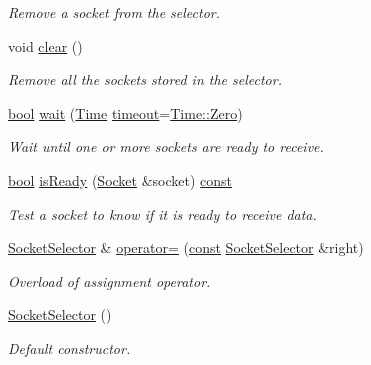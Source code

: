 \begin{DoxyCompactItemize}
\begin{DoxyCompactList}\small\item\em Remove a socket from the selector. \end{DoxyCompactList}\item 
void \hyperlink{classsf_1_1_socket_selector_a76e650acb0199d4be91e90a493fbc91a}{clear} ()
\begin{DoxyCompactList}\small\item\em Remove all the sockets stored in the selector. \end{DoxyCompactList}\item 
\hyperlink{term__entry_8h_a002004ba5d663f149f6c38064926abac}{bool} \hyperlink{classsf_1_1_socket_selector_a9cfda5475f17925e65889394d70af702}{wait} (\hyperlink{classsf_1_1_time}{Time} \hyperlink{_ndk_8cpp_a174cf046f3b5dbb1258515b3f138b8c7}{timeout}=\hyperlink{classsf_1_1_time_aa343e67f43a940e7b3b51aa10a495f2f}{Time\-::\-Zero})
\begin{DoxyCompactList}\small\item\em Wait until one or more sockets are ready to receive. \end{DoxyCompactList}\item 
\hyperlink{term__entry_8h_a002004ba5d663f149f6c38064926abac}{bool} \hyperlink{classsf_1_1_socket_selector_a8e67b463db05eadb4d356992c896833c}{is\-Ready} (\hyperlink{classsf_1_1_socket}{Socket} \&socket) \hyperlink{term__entry_8h_a57bd63ce7f9a353488880e3de6692d5a}{const} 
\begin{DoxyCompactList}\small\item\em Test a socket to know if it is ready to receive data. \end{DoxyCompactList}\item 
\hyperlink{classsf_1_1_socket_selector}{Socket\-Selector} \& \hyperlink{classsf_1_1_socket_selector_ae6395c7a8d29a9ea14939cc5d1ba3a33}{operator=} (\hyperlink{term__entry_8h_a57bd63ce7f9a353488880e3de6692d5a}{const} \hyperlink{classsf_1_1_socket_selector}{Socket\-Selector} \&right)
\begin{DoxyCompactList}\small\item\em Overload of assignment operator. \end{DoxyCompactList}\item 
\hyperlink{classsf_1_1_socket_selector_a741959c5158aeb1e4457cad47d90f76b}{Socket\-Selector} ()
\begin{DoxyCompactList}\small\item\em Default constructor. \end{DoxyCompactList}\item 

\end{DoxyCompactItemize}

